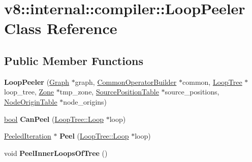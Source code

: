 \hypertarget{classv8_1_1internal_1_1compiler_1_1LoopPeeler}{}\section{v8\+:\+:internal\+:\+:compiler\+:\+:Loop\+Peeler Class Reference}
\label{classv8_1_1internal_1_1compiler_1_1LoopPeeler}
\subsection*{Public Member Functions}
\begin{DoxyCompactItemize}
\item 
\mbox{\label{classv8_1_1internal_1_1compiler_1_1LoopPeeler_a8d0824afe14581c9c937fc3eb34413dd}} 
{\bfseries Loop\+Peeler} (\mbox{\hyperlink{classv8_1_1internal_1_1compiler_1_1Graph}{Graph}} $\ast$graph, \mbox{\hyperlink{classv8_1_1internal_1_1compiler_1_1CommonOperatorBuilder}{Common\+Operator\+Builder}} $\ast$common, \mbox{\hyperlink{classv8_1_1internal_1_1compiler_1_1LoopTree}{Loop\+Tree}} $\ast$loop\+\_\+tree, \mbox{\hyperlink{classv8_1_1internal_1_1Zone}{Zone}} $\ast$tmp\+\_\+zone, \mbox{\hyperlink{classv8_1_1internal_1_1compiler_1_1SourcePositionTable}{Source\+Position\+Table}} $\ast$source\+\_\+positions, \mbox{\hyperlink{classv8_1_1internal_1_1compiler_1_1NodeOriginTable}{Node\+Origin\+Table}} $\ast$node\+\_\+origins)
\item 
\mbox{\label{classv8_1_1internal_1_1compiler_1_1LoopPeeler_ac74075b03e5550934fda63e39d5ecb81}} 
\mbox{\hyperlink{classbool}{bool}} {\bfseries Can\+Peel} (\mbox{\hyperlink{classv8_1_1internal_1_1compiler_1_1LoopTree_1_1Loop}{Loop\+Tree\+::\+Loop}} $\ast$loop)
\item 
\mbox{\label{classv8_1_1internal_1_1compiler_1_1LoopPeeler_a58c298f7d181a6788674cf552cf5b08d}} 
\mbox{\hyperlink{classv8_1_1internal_1_1compiler_1_1PeeledIteration}{Peeled\+Iteration}} $\ast$ {\bfseries Peel} (\mbox{\hyperlink{classv8_1_1internal_1_1compiler_1_1LoopTree_1_1Loop}{Loop\+Tree\+::\+Loop}} $\ast$loop)
\item 
\mbox{\label{classv8_1_1internal_1_1compiler_1_1LoopPeeler_acd13fd3091b653aee81ee95f160b5e24}} 
void {\bfseries Peel\+Inner\+Loops\+Of\+Tree} ()
\end{DoxyCompactItemize}
